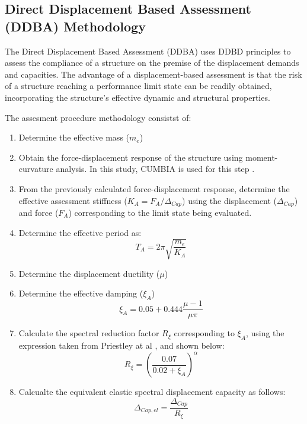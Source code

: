 \subsection{Direct Displacement Based Assessment (DDBA) Methodology}

The Direct Displacement Based Assessment (DDBA) uses DDBD principles to assess the compliance of a structure on the premise of the displacement demands and capacities. The advantage of a displacement-based assessment is that the risk of a structure reaching a performance limit state can be readily obtained, incorporating the structure's effective dynamic and structural properties. 

The assesment procedure methodology consistst of:
\begin{enumerate}
    \item Determine the effective mass ($m_{e}$)
    \item Obtain the force-displacement response of the structure using moment-curvature analysis. In this study, CUMBIA is used for this step \cite{Montejo2007}.
    \item From the previously calculated force-displacement response, determine the effective assessment stiffness ($K_{A}=F_{A}/\Delta_{Cap}$) using the displacement ($\Delta_{Cap}$) and force ($F_{A}$) corresponding to the limit state being evaluated.
    \item Determine the effective period as:
    \begin{equation}
        T_{A}=2\pi \sqrt{\frac{m_{e}}{K_{A}}}
    \end{equation}
    \item Determine the displacement ductility ($\mu$)
    \item Determine the effective damping ($\xi_{A}$)
    \begin{equation}
        \xi_{A}=0.05+0.444\frac{\mu-1}{\mu\pi}
    \end{equation}
    \item Calculate the spectral reduction factor $R_{\xi}$ corresponding to $\xi_{A}$, using the expression taken from Priestley at al \cites{Priestley2007}, and shown below:
    \begin{equation}
        R_{\xi}=\left(\frac{0.07}{0.02+\xi_{A}}\right)^{\alpha}
    \end{equation}
    \item Calcualte the equivalent elastic spectral displacement capacity as follows:
    \begin{equation}
        \Delta_{Cap,el}=\frac{\Delta_{Cap}}{R_{\xi}}

\end{equation}
\end{enumerate}
